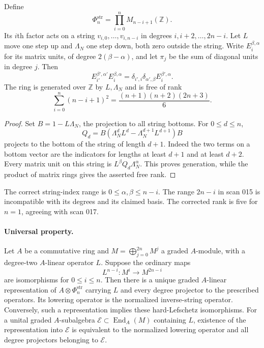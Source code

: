 \documentclass[11pt,a4paper]{article}
\theoremstyle{remark}
\begin{document}
Define
\[
 \Phi_n^{\mathrm{str}}=\prod_{i=0}^n M_{n-i+1}(\mathbb Z).
\]
Its $i$th factor acts on a string $v_{i,0},\ldots,v_{i,n-i}$ in degrees
$i,i+2,\ldots,2n-i$.  Let $L$ move one step up and $\Lambda_N$ one
step down, both zero outside the string.  Write $E_i^{\beta,\alpha}$
for its matrix units, of degree $2(\beta-\alpha)$, and let $\pi_j$
be the sum of diagonal units in degree $j$.  Then
\[
 E_{i'}^{\beta',\alpha'}E_i^{\beta,\alpha}
   =\delta_{i',i}\delta_{\alpha',\beta}E_i^{\beta',\alpha}.
\]
The ring is generated over $\mathbb Z$ by $L,\Lambda_N$ and is free of
rank
\[
 \sum_{i=0}^n(n-i+1)^2=\frac{(n+1)(n+2)(2n+3)}6.
\]

\begin{proof}
Set $B=1-L\Lambda_N$, the projection to all string bottoms.  For
$0\le d\le n$,
\[
 Q_d=B(\Lambda_N^dL^d-\Lambda_N^{d+1}L^{d+1})B
\]
projects to the bottom of the string of length $d+1$.  Indeed the two
terms on a bottom vector are the indicators for lengths at least $d+1$
and at least $d+2$.  Every matrix unit on this string is
$L^\beta Q_d\Lambda_N^\alpha$.  This proves generation, while the
product of matrix rings gives the asserted free rank.
\end{proof}

The correct string-index range is $0\le\alpha,\beta\le n-i$.
The range $2n-i$ in scan 015 is incompatible with its degrees and its
claimed basis.  The corrected rank is five for $n=1$, agreeing with
scan 017.

\paragraph{Universal property.}
Let $A$ be a commutative ring and $M=\bigoplus_{j=0}^{2n}M^j$ a graded
$A$-module, with a degree-two $A$-linear operator $L$.  Suppose the ordinary
maps
\[
 L^{n-i}:M^i\longrightarrow M^{2n-i}
\]
are isomorphisms for $0\le i\le n$.  Then there is a unique graded
$A$-linear representation of $A\otimes\Phi_n^{\mathrm{str}}$ carrying
$L$ and every degree projector to the prescribed operators.  Its lowering
operator is the normalized inverse-string operator.  Conversely, such a
representation implies these hard-Lefschetz isomorphisms.  For a
unital graded $A$-subalgebra $\mathcal E\subset\operatorname{End}_A(M)$
containing $L$, existence of the
representation into $\mathcal E$ is equivalent to the normalized lowering
operator and all degree projectors belonging to $\mathcal E$.
\end{document}
